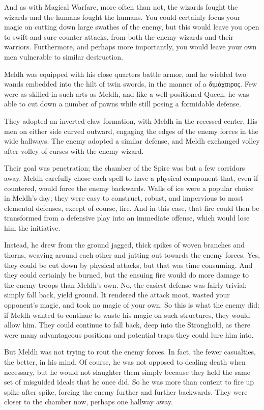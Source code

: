 And as with Magical Warfare, more often than not, the wizards fought the wizards and the humans fought the humans. You could certainly focus your magic on cutting down large swathes of the enemy, but this would leave you open to swift and sure counter attacks, from both the enemy wizards and their warriors. Furthermore, and perhaps more importantly, you would leave your own men vulnerable to similar destruction.

Meldh was equipped with his close quarters battle armor, and he wielded two wands embedded into the hilt of twin swords, in the manner of a διμάχαιρος. Few were as skilled in such arts as Meldh, and like a well-positioned Queen, he was able to cut down a number of pawns while still posing a formidable defense.

They adopted an inverted-claw formation, with Meldh in the recessed center. His men on either side curved outward, engaging the edges of the enemy forces in the wide hallways. The enemy adopted a similar defense, and Meldh exchanged volley after volley of curses with the enemy wizard.

Their goal was penetration; the chamber of the Spire was but a few corridors away. Meldh carefully chose each spell to have a physical component that, even if countered, would force the enemy backwards. Walls of ice were a popular choice in Meldh’s day; they were easy to construct, robust, and impervious to most elemental defenses, except of course, fire. And in this case, that fire could then be transformed from a defensive play into an immediate offense, which would lose him the initiative.

Instead, he drew from the ground jagged, thick spikes of woven branches and thorns, weaving around each other and jutting out towards the enemy forces. Yes, they could be cut down by physical attacks, but that was time consuming. And they could certainly be burned, but the ensuing fire would do more damage to the enemy troops than Meldh’s own. No, the easiest defense was fairly trivial: simply fall back, yield ground. It rendered the attack moot, wasted your opponent’s magic, and took no magic of your own. So this is what the enemy did: if Meldh wanted to continue to waste his magic on such structures, they would allow him. They could continue to fall back, deep into the Stronghold, as there were many advantageous positions and potential traps they could lure him into.

But Meldh was not trying to rout the enemy forces. In fact, the fewer casualties, the better, in his mind. Of course, he was not opposed to dealing death when necessary, but he would not slaughter them simply because they held the same set of misguided ideals that he once did. So he was more than content to fire up spike after spike, forcing the enemy further and further backwards. They were closer to the chamber now, perhaps one hallway away.

